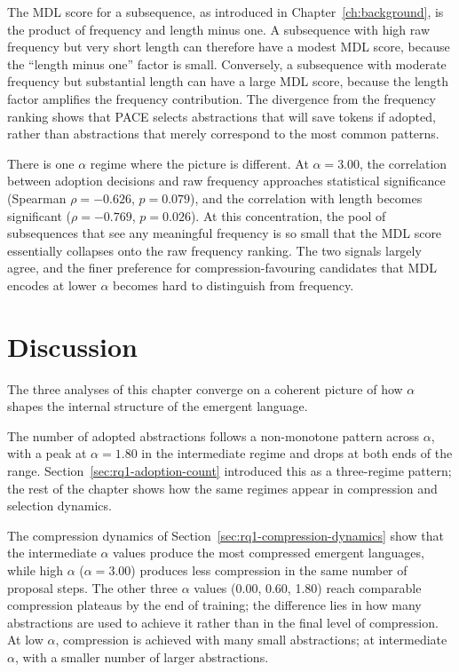 The MDL score for a subsequence, as introduced in Chapter~\ref{ch:background}, is the product of frequency and length minus one. A subsequence with high raw frequency but very short length can therefore have a modest MDL score, because the ``length minus one'' factor is small. Conversely, a subsequence with moderate frequency but substantial length can have a large MDL score, because the length factor amplifies the frequency contribution. The divergence from the frequency ranking shows that PACE selects abstractions that will save tokens if adopted, rather than abstractions that merely correspond to the most common patterns.

There is one $\alpha$ regime where the picture is different. At $\alpha = 3.00$, the correlation between adoption decisions and raw frequency approaches statistical significance (Spearman $\rho = -0.626$, $p = 0.079$), and the correlation with length becomes significant ($\rho = -0.769$, $p = 0.026$). At this concentration, the pool of subsequences that see any meaningful frequency is so small that the MDL score essentially collapses onto the raw frequency ranking. The two signals largely agree, and the finer preference for compression-favouring candidates that MDL encodes at lower $\alpha$ becomes hard to distinguish from frequency.

\section{Discussion}
\label{sec:rq1-discussion}

The three analyses of this chapter converge on a coherent picture of how $\alpha$ shapes the internal structure of the emergent language.

The number of adopted abstractions follows a non-monotone pattern across $\alpha$, with a peak at $\alpha = 1.80$ in the intermediate regime and drops at both ends of the range. Section~\ref{sec:rq1-adoption-count} introduced this as a three-regime pattern; the rest of the chapter shows how the same regimes appear in compression and selection dynamics.

The compression dynamics of Section~\ref{sec:rq1-compression-dynamics} show that the intermediate $\alpha$ values produce the most compressed emergent languages, while high $\alpha$ ($\alpha = 3.00$) produces less compression in the same number of proposal steps. The other three $\alpha$ values (0.00, 0.60, 1.80) reach comparable compression plateaus by the end of training; the difference lies in how many abstractions are used to achieve it rather than in the final level of compression. At low $\alpha$, compression is achieved with many small abstractions; at intermediate $\alpha$, with a smaller number of larger abstractions.

